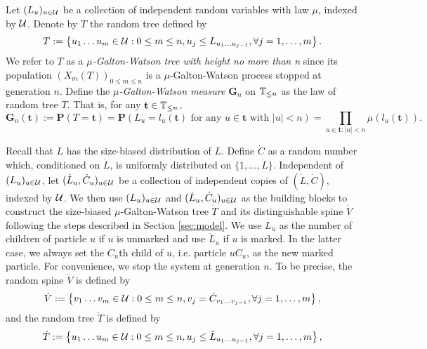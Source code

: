 \documentclass[12pt]{amsart}
\numberwithin{equation}{section}
\newcommand{\defn}[1]{{\em #1}}
\newcommand{\prob}{\mathbf P}
\newcommand{\set}[1]{\left\{ #1 \right\}}
\newcommand{\tree}{\mathbf t}
\newcommand{\bG}{\mathbf G}\newcommand{\bbG}{\mathbb G}\newcommand{\cG}{\mathcal G}
\begin{document}
\par
	Let $(L_u)_{u\in\mathcal U}$ be a collection of independent random variables with law $\mu$, indexed by $\mathcal U$. Denote by $T$ the random tree defined by
\begin{equation*}
		T
	:=
		\set{u_1\dots u_m\in \cU: 0\le m\le n, u_j\leq L_{u_1\dots u_{j-1}},\forall j=1,\dots,m}.
\end{equation*}
We refer to $T$ as a \defn{$\mu$-Galton-Watson tree with height no more than n}
	since its population
		$(X_m(T))_{0\le m\le n}$
is a $\mu$-Galton-Watson process stopped at generation $n$.
	Define the \defn{$\mu$-Galton-Watson measure $\bG_n$} on $\mathbb T_{\leq n}$ as the law of random tree $T$. That is, for any $\tree\in\bbT_{\leq n}$,
\begin{equation*}
		\bG_n(\tree)
    :=
		\prob(T=\tree)
	=
        \prob(L_u=l_u(\tree)\text{ for any } u\in\tree \text{ with }|u|<n)
	=
		\prod_{u\in \tree:|u|<n}\mu(l_u(\tree)).
\end{equation*}
\par
	Recall that $\dot L$ has the size-biased distribution of $L$.
	Define $\dot C$ as a random number which, conditioned on $\dot L$, is uniformly distributed on
	$\{1,\dots,\dot L\}$.
	Independent of $(L_u)_{u\in\mathcal U}$, let $(\dot L_u,\dot C_u)_{u\in \mathcal U}$ be a collection of independent copies of $(\dot L,\dot C)$, indexed by $\mathcal U$.
	We then use $(L_u)_{u\in\mathcal U}$ and $(\dot L_u,\dot C_u)_{u\in\mathcal U}$ as the building blocks to construct the size-biased 
$\mu$-Galton-Watson tree $\dot T$ and its distinguishable spine $\dot V$ 
	following the steps described in Section \ref{sec:model}.
	We use $L_u$ as the number of children of particle $u$ if $u$ is unmarked and use $\dot L_u$ if $u$ is marked.
	In the latter case, we always set the $C_u$th child of $u$, i.e. particle $uC_u$, as the new marked particle.
	For convenience, we stop the system at generation $n$. To be precise, the random spine $\dot V$ is defined by
\begin{equation*}
		\dot V
	:=
		\set{v_1\dots v_m\in \cU:0\le m\le n, v_j=\dot C_{v_1\dots v_{j-1}},\forall j=1,\dots,m},
\end{equation*}
	and the random tree $\dot T$ is defined by
\begin{equation*}
		\dot T
	:=
		\set{u_1\dots u_m\in\cU: 0\le m\le n,u_j\leq \tilde L_{u_1\dots u_{j-1}},\forall j=1,\dots,m},
\end{equation*}
\end{document}
